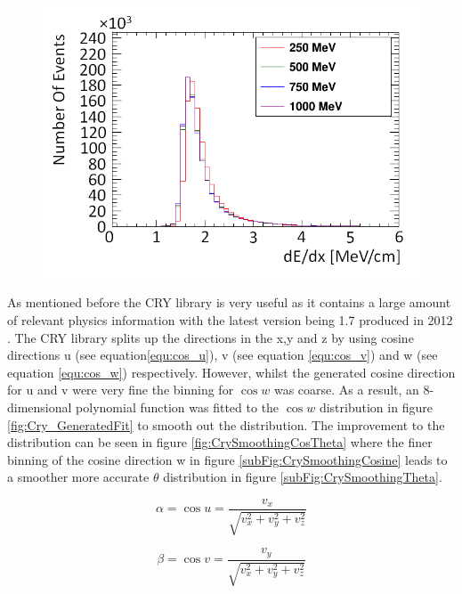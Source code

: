 \begin{figure}[!h]
 \centering
 \includegraphics[width=0.5\linewidth]{Chapter4/Figs/Raster/year1Plots/muons_per_mev_cmMedText.png}
 \label{fig:mev_per_cm_muons}
\end{figure}

As mentioned before the CRY library is very useful as it contains a large amount of relevant physics information with the latest version being 1.7 produced in 2012 \cite{hagmann2012cosmicCry}. The CRY library splits up the directions in the x,y and z by using cosine directions u (see equation\ref{equ:cos_u}), v (see equation \ref{equ:cos_v}) and w (see equation \ref{equ:cos_w}) respectively. However, whilst the generated cosine direction for u and v were very fine the binning for $\cos{w}$ was coarse. As a result, an 8-dimensional polynomial function was fitted to the $\cos{w}$ distribution in figure \ref{fig:Cry_GeneratedFit} to smooth out the distribution. The improvement to the distribution can be seen in figure \ref{fig:CrySmoothingCosTheta} where the finer binning of the cosine direction w in figure \ref{subFig:CrySmoothingCosine} leads to a smoother more accurate $\theta$ distribution in figure \ref{subFig:CrySmoothingTheta}. 

\begin{equation}
\alpha = \cos{u} = \frac{v_x}{\sqrt{v_x^2+v_y^2+v_z^2}}
\label{equ:cos_u}
\end{equation}

\begin{equation}
\beta = \cos{v} = \frac{v_y}{\sqrt{v_x^2+v_y^2+v_z^2}}
\label{equ:cos_v}
\end{equation}

